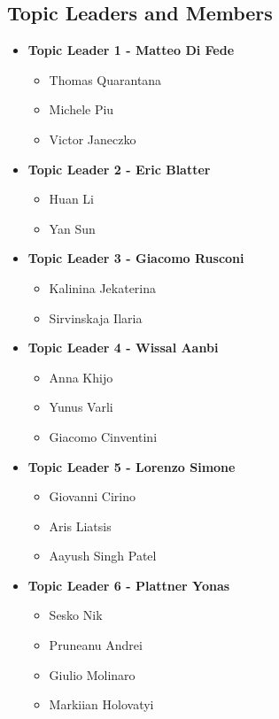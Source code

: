 \documentclass[a4paper,12pt]{article}
\begin{document}
\subsection*{Topic Leaders and Members}
\begin{itemize}[leftmargin=1.2cm, label={}]
    \item \textbf{Topic Leader 1 - Matteo Di Fede}
    \begin{itemize}[leftmargin=1.5cm]
        \item Thomas Quarantana
        \item Michele Piu
        \item Victor Janeczko
    \end{itemize}

    \item \textbf{Topic Leader 2 - Eric Blatter}
    \begin{itemize}[leftmargin=1.5cm]
        \item Huan Li
        \item Yan Sun
    \end{itemize}

    \item \textbf{Topic Leader 3 - Giacomo Rusconi}
    \begin{itemize}[leftmargin=1.5cm]
        \item Kalinina Jekaterina
        \item Sirvinskaja Ilaria
    \end{itemize}
    
    \vspace{0.5cm}

    \item \textbf{Topic Leader 4 - Wissal Aanbi}
    \begin{itemize}[leftmargin=1.5cm]
        \item Anna Khijo
        \item Yunus Varli
        \item Giacomo Cinventini
    \end{itemize}

    \item \textbf{Topic Leader 5 - Lorenzo Simone}
    \begin{itemize}[leftmargin=1.5cm]
        \item Giovanni Cirino
        \item Aris Liatsis
        \item Aayush Singh Patel
    \end{itemize}

    \item \textbf{Topic Leader 6 - Plattner Yonas}
    \begin{itemize}[leftmargin=1.5cm]
        \item Sesko Nik
        \item Pruneanu Andrei
        \item Giulio Molinaro
        \item Markiian Holovatyi
    \end{itemize}
\end{itemize}
\end{document}
